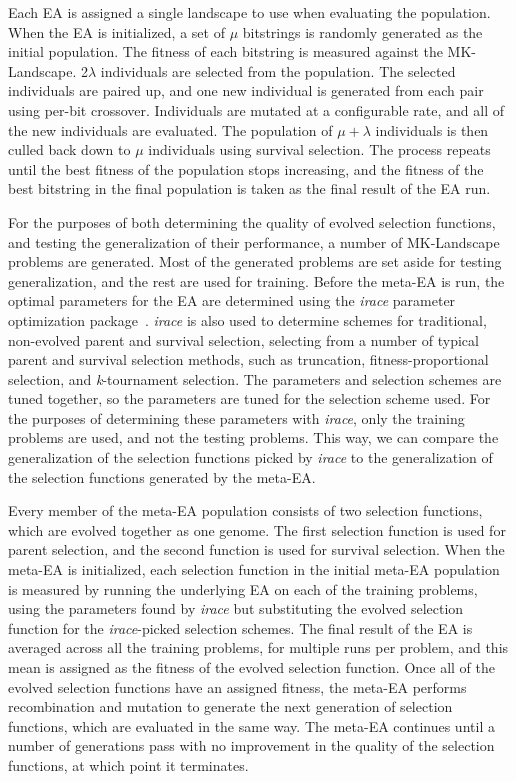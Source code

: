 \documentclass[sigconf]{acmart}
\begin{document}
Each EA is assigned a single landscape to use when evaluating the population. When the EA is initialized, a set of $\mu$ bitstrings is randomly generated as the initial population. The fitness of each bitstring is measured against the MK-Landscape. 2$\lambda$ individuals are selected from the population. The selected individuals are paired up, and one new individual is generated from each pair using per-bit crossover. Individuals are mutated at a configurable rate, and all of the new individuals are evaluated. The population of $\mu+\lambda$ individuals is then culled back down to $\mu$ individuals using survival selection. The process repeats until the best fitness of the population stops increasing, and the fitness of the best bitstring in the final population is taken as the final result of the EA run.

For the purposes of both determining the quality of evolved selection functions, and testing the generalization of their performance, a number of MK-Landscape problems are generated. Most of the generated problems are set aside for testing generalization, and the rest are used for training. Before the meta-EA is run, the optimal parameters for the EA are determined using the \textit{irace} parameter optimization package~\citep{irace}. \textit{irace} is also used to determine schemes for traditional, non-evolved parent and survival selection, selecting from a number of typical parent and survival selection methods, such as truncation, fitness-proportional selection, and \textit{k}-tournament selection. The parameters and selection schemes are tuned together, so the parameters are tuned for the selection scheme used. For the purposes of determining these parameters with \textit{irace}, only the training problems are used, and not the testing problems. This way, we can compare the generalization of the selection functions picked by \textit{irace} to the generalization of the selection functions generated by the meta-EA.

Every member of the meta-EA population consists of two selection functions, which are evolved together as one genome. The first selection function is used for parent selection, and the second function is used for survival selection. When the meta-EA is initialized, each selection function in the initial meta-EA population is measured by running the underlying EA on each of the training problems, using the parameters found by \textit{irace} but substituting the evolved selection function for the \textit{irace}-picked selection schemes. The final result of the EA is averaged across all the training problems, for multiple runs per problem, and this mean is assigned as the fitness of the evolved selection function. Once all of the evolved selection functions have an assigned fitness, the meta-EA performs recombination and mutation to generate the next generation of selection functions, which are evaluated in the same way. The meta-EA continues until a number of generations pass with no improvement in the quality of the selection functions, at which point it terminates.
\end{document}
